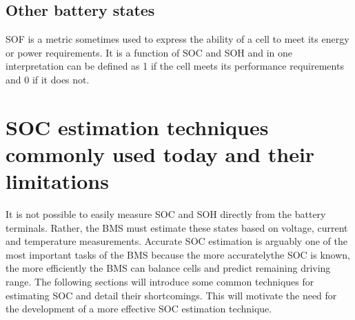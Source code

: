 		\subsection{Other battery states}
SOF is a metric sometimes used to express the ability of a cell to meet its energy or power requirements. It is a function of SOC and SOH and in one interpretation can be defined as 1 if the cell meets its performance requirements and 0 if it does not.
	\section{SOC estimation techniques commonly used today and their limitations}
It is not possible to easily measure SOC and SOH directly from the battery terminals. Rather, the BMS must estimate these states based on voltage, current and temperature measurements\cite[p.~9]{HabiballahRahimi-EichiUnnatiOhjaFedericoBaronti2013}. Accurate SOC estimation is arguably one of the most important tasks of the BMS because the more accuratelythe SOC is known, the more efficiently the BMS can balance cells and predict remaining driving range.  The following sections will introduce some common techniques for estimating SOC and detail their shortcomings. This will motivate the need for the development of a more effective SOC estimation technique. %

